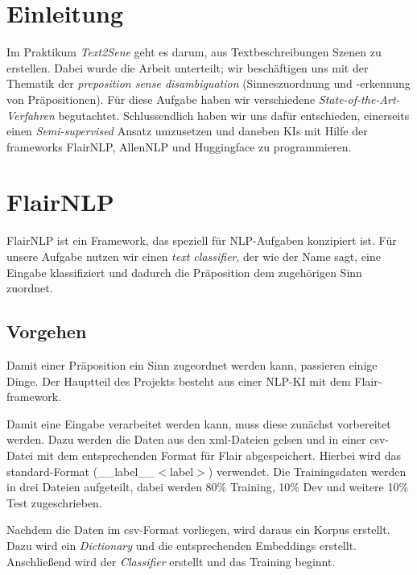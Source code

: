\documentclass[10pt,a4paper]{article}
\begin{document}
\tableofcontents
\newpage

\section{Einleitung}
\begin{flushleft}
Im Praktikum \textit{Text2Sene} geht es darum, aus Textbeschreibungen Szenen zu erstellen. Dabei wurde die Arbeit unterteilt; wir beschäftigen uns mit der Thematik der \textit{preposition sense disambiguation} (Sinneszuordnung und -erkennung von Präpositionen). Für diese Aufgabe haben wir verschiedene \textit{State-of-the-Art-Verfahren} begutachtet. Schlussendlich haben wir uns dafür entschieden, einerseits einen \textit{Semi-supervised} Ansatz umzusetzen und daneben KIs mit Hilfe der frameworks FlairNLP, AllenNLP und Huggingface zu programmieren.
\end{flushleft}

\section{FlairNLP}
\begin{flushleft}
FlairNLP ist ein Framework, das speziell für NLP-Aufgaben konzipiert ist. Für unsere Aufgabe nutzen wir einen \textit{text classifier}, der wie der Name sagt, eine Eingabe klassifiziert und dadurch die Präposition dem zugehörigen Sinn zuordnet.
\end{flushleft}

\subsection{Vorgehen}
\begin{flushleft}
Damit einer Präposition ein Sinn zugeordnet werden kann, passieren einige Dinge. Der Hauptteil des Projekts besteht aus einer NLP-KI mit dem Flair-framework.

Damit eine Eingabe verarbeitet werden kann, muss diese zunächst vorbereitet werden. Dazu werden die Daten aus den xml-Dateien gelsen und in einer csv-Datei mit dem entsprechenden Format für Flair abgespeichert. Hierbei wird das standard-Format (\_\_label\_\_$<$label$>$) verwendet. Die Trainingsdaten werden in drei Dateien aufgeteilt, dabei werden 80\% Training, 10\% Dev und weitere 10\% Test zugeschrieben.

Nachdem die Daten im csv-Format vorliegen, wird daraus ein Korpus erstellt. Dazu wird ein \textit{Dictionary} und die entsprechenden Embeddings erstellt. Anschließend wird der \textit{Classifier} erstellt und das Training beginnt.
\end{flushleft}
\end{document}
